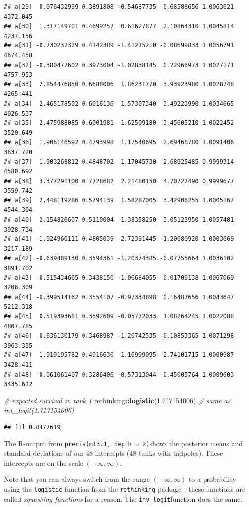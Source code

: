 \documentclass[
]{book}
\newenvironment{Shaded}{\begin{snugshade}}{\end{snugshade}}
\newcommand{\CommentTok}[1]{\textcolor[rgb]{0.56,0.35,0.01}{\textit{#1}}}
\newcommand{\FloatTok}[1]{\textcolor[rgb]{0.00,0.00,0.81}{#1}}
\newcommand{\FunctionTok}[1]{\textcolor[rgb]{0.13,0.29,0.53}{\textbf{#1}}}
\newcommand{\NormalTok}[1]{#1}
\newcommand{\SpecialCharTok}[1]{\textcolor[rgb]{0.81,0.36,0.00}{\textbf{#1}}}
\begin{document}
\begin{verbatim}
## a[29]  0.076432999 0.3891808 -0.54687735  0.68588656 1.0063621 4372.045
## a[30]  1.317149701 0.4699257  0.61627877  2.10864310 1.0045814 4237.156
## a[31] -0.730232329 0.4142389 -1.41215210 -0.08699833 1.0056791 4674.458
## a[32] -0.380477602 0.3973004 -1.02838145  0.22966973 1.0027171 4757.953
## a[33]  2.854476850 0.6688006  1.86231770  3.93923980 1.0028748 4265.441
## a[34]  2.465178502 0.6016136  1.57307340  3.49223990 1.0034665 4026.537
## a[35]  2.475988085 0.6001981  1.62509180  3.45605210 1.0022452 3520.649
## a[36]  1.906146592 0.4793998  1.17540695  2.69468780 1.0091406 3637.720
## a[37]  1.903268812 0.4848702  1.17045730  2.68925485 0.9999314 4580.692
## a[38]  3.377291100 0.7728682  2.21480150  4.70722490 0.9999677 3559.742
## a[39]  2.448119286 0.5794139  1.58287005  3.42906255 1.0005167 4544.304
## a[40]  2.154826607 0.5110004  1.38358250  3.05123950 1.0057481 3928.734
## a[41] -1.924960111 0.4805039 -2.72391445 -1.20680920 1.0003669 3217.189
## a[42] -0.639489130 0.3594361 -1.20374385 -0.07755664 1.0036102 3891.702
## a[43] -0.515434665 0.3438150 -1.06684055  0.01709138 1.0067069 3206.309
## a[44] -0.399514162 0.3554107 -0.97334898  0.16487656 1.0043647 5212.318
## a[45]  0.519393681 0.3592609 -0.05772033  1.08264245 1.0022088 4807.785
## a[46] -0.636130179 0.3468987 -1.20742535 -0.10853365 1.0071298 3963.335
## a[47]  1.919195782 0.4916630  1.16999095  2.74101715 1.0000987 3428.411
## a[48] -0.061061407 0.3286406 -0.57313044  0.45005764 1.0009603 3435.612
\end{verbatim}

\begin{Shaded}
\begin{Highlighting}[]
\CommentTok{\# expected survival in tank 1}
\NormalTok{rethinking}\SpecialCharTok{::}\FunctionTok{logistic}\NormalTok{(}\FloatTok{1.717154006}\NormalTok{) }\CommentTok{\# same as inv\_logit(1.717154006)}
\end{Highlighting}
\end{Shaded}

\begin{verbatim}
## [1] 0.8477619
\end{verbatim}

The R-output from \texttt{precis(m13.1,\ depth\ =\ 2)}shows the posterior means and standard deviations of
our \(48\) intercepts (\(48\) tanks with tadpoles). These intercepts are on the scale \((-\infty, \infty)\).

Note that you can always switch from the range \((-\infty, \infty)\) to a probability using the \texttt{logistic} function
from the \texttt{rethinking} package - these functions are called \emph{squashing functions} for a reason.
The \texttt{inv\_logit}function does the same.
\end{document}
